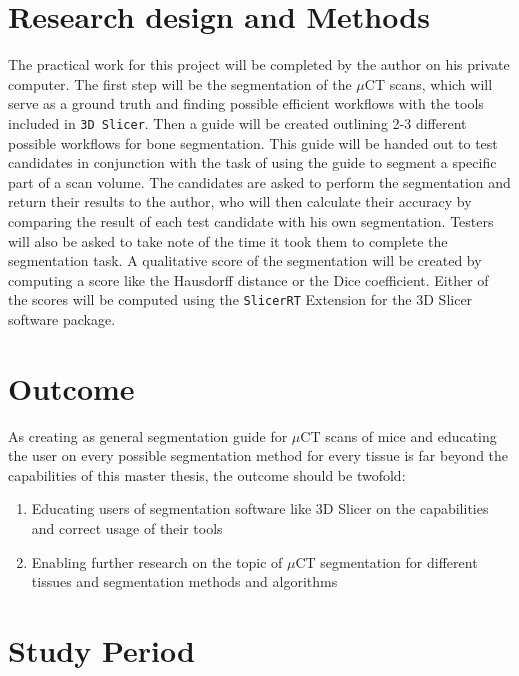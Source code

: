 \clearpage
\section{Research design and Methods}
\begin{body}
	The practical work for this project will be completed by the author on his private computer.
	The first step will be the segmentation of the $\mu$CT scans, which will serve as a ground truth and finding possible efficient workflows with the tools included in \texttt{3D Slicer}.
	Then a guide will be created outlining 2-3 different possible workflows for bone segmentation.
	This guide will be handed out to test candidates in conjunction with the task of using the guide to segment a specific part of a scan volume.
	The candidates are asked to perform the segmentation and return their results to the author, who will then calculate their accuracy by comparing the result of each test candidate with his own segmentation. Testers will also be asked to take note of the time it took them to complete the segmentation task. A qualitative score of the segmentation will be created by computing a score like the Hausdorff distance\cite{birsanOneHundredYears2006} or the Dice coefficient\cite{diceMeasuresAmountEcologic1945}. Either of the scores will be computed using the \texttt{SlicerRT}\cite{pinterSlicerRTRadiationTherapy2012} Extension for the 3D Slicer software package.
\end{body}

\section{Outcome}
\begin{body}
	As creating as general segmentation guide for $\mu$CT scans of mice and educating the user on every possible segmentation method for every tissue is far beyond the capabilities of this master thesis, the outcome should be twofold:
	\begin{enumerate}
		\item Educating users of segmentation software like 3D Slicer on the capabilities and correct usage of their tools
		\item Enabling further research on the topic of $\mu$CT segmentation for different tissues and segmentation methods and algorithms
	\end{enumerate}
\end{body}

\clearpage
\section{Study Period}
